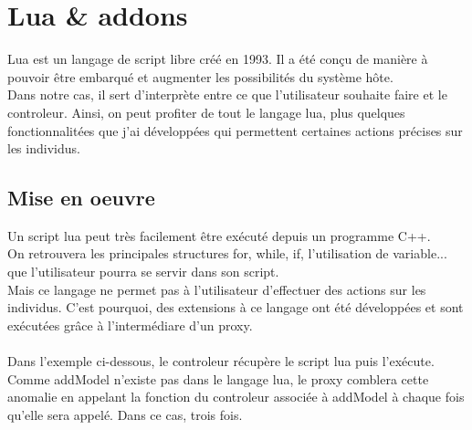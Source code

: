 \noindent\begin{minipage}{\linewidth}%
\end{minipage}

\section{Lua \& addons}
Lua est un langage de script libre créé en 1993. Il a été conçu de manière à pouvoir être embarqué et augmenter les possibilités du système hôte.\\
Dans notre cas, il sert d'interprète entre ce que l'utilisateur souhaite faire et le controleur. Ainsi, on peut profiter de tout le langage lua, plus quelques fonctionnalitées que j'ai développées qui permettent certaines actions précises sur les individus.\\
\subsection{Mise en oeuvre}
Un script lua peut très facilement être exécuté depuis un programme C++. \\
On retrouvera les principales structures for, while, if, l'utilisation de variable... que l'utilisateur pourra se servir dans son script.\\
Mais ce langage ne permet pas à l'utilisateur d'effectuer des actions sur les individus. C'est pourquoi, des extensions à ce langage ont été développées et sont exécutées grâce à l'intermédiare d'un proxy.\\
\\
Dans l'exemple ci-dessous, le controleur récupère le script lua puis l'exécute. Comme addModel n'existe pas dans le langage lua, le proxy comblera cette anomalie en appelant la fonction du controleur associée à addModel à chaque fois qu'elle sera appelé. Dans ce cas, trois fois.\\

